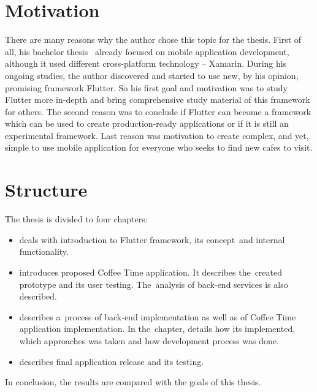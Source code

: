 \begin{introduction}
\section{Motivation}
There are many reasons why the author chose this topic for the thesis. First of all, his bachelor thesis~\cite{nymsap-bp} already focused on mobile application development, although it used different cross-platform technology -- Xamarin. During his ongoing studies, the author discovered and started to use new, by his opinion, promising framework Flutter. So his first goal and motivation was to study Flutter more in-depth and bring comprehensive study material of this framework for others. The second reason was to conclude if Flutter can become a framework which can be used to create production-ready applications or if it is still an experimental framework. Last reason was motivation to create complex, and yet, simple to use mobile application for everyone who seeks to find new cafes to visit.

\section{Structure}
The thesis is divided to four chapters:
\begin{itemize}
\item {} deals with introduction to Flutter framework, its concept~and internal functionality.
\item {} introduces proposed Coffee Time application. It describes the~created prototype and its user testing. The~analysis of back-end services is also described. 
\item {} describes a~process of back-end implementation as well as of Coffee Time application implementation. In the~chapter, details how its implemented, which approaches was taken and how development process was done. 
\item {} describes final application release and its testing. 
\end{itemize}
In conclusion, the results are compared with the goals of this thesis. 
\end{introduction}